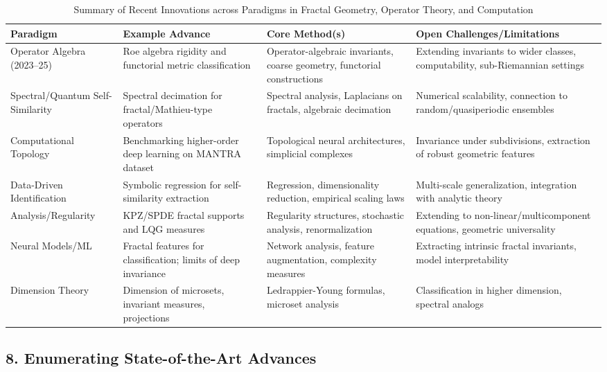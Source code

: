 \documentclass[sigconf]{acmart}
\begin{document}
\begin{table*}[htbp]
\centering
\caption{Summary of Recent Innovations across Paradigms in Fractal Geometry, Operator Theory, and Computation}
\label{tab:summary-sota}
\begin{adjustbox}{max width=\textwidth}
\begin{tabular}{@{}llll@{}}
\toprule
Paradigm & Example Advance & Core Method(s) & Open Challenges/Limitations \\
\midrule
Operator Algebra (2023--25) & Roe algebra rigidity and functorial metric classification~\cite{ref52} & Operator-algebraic invariants, coarse geometry, functorial constructions & Extending invariants to wider classes, computability, sub-Riemannian settings \\
Spectral/Quantum Self-Similarity & Spectral decimation for fractal/Mathieu-type operators~\cite{ref54} & Spectral analysis, Laplacians on fractals, algebraic decimation & Numerical scalability, connection to random/quasiperiodic ensembles \\
Computational Topology & Benchmarking higher-order deep learning on MANTRA dataset~\cite{ref26} & Topological neural architectures, simplicial complexes & Invariance under subdivisions, extraction of robust geometric features \\
Data-Driven Identification & Symbolic regression for self-similarity extraction~\cite{ref65} & Regression, dimensionality reduction, empirical scaling laws & Multi-scale generalization, integration with analytic theory \\
Analysis/Regularity & KPZ/SPDE fractal supports and LQG measures~\cite{ref81,ref94} & Regularity structures, stochastic analysis, renormalization & Extending to non-linear/multicomponent equations, geometric universality \\
Neural Models/ML & Fractal features for classification; limits of deep invariance~\cite{ref44,ref26} & Network analysis, feature augmentation, complexity measures & Extracting intrinsic fractal invariants, model interpretability \\
Dimension Theory & Dimension of microsets, invariant measures, projections~\cite{ref69,ref72} & Ledrappier-Young formulas, microset analysis & Classification in higher dimension, spectral analogs \\
\bottomrule
\end{tabular}
\end{adjustbox}
\end{table*}

\subsection*{8. Enumerating State-of-the-Art Advances}
\end{document}
